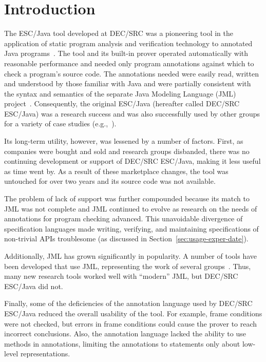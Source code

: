 \documentclass{llncs}
\begin{document}

\section{Introduction}

The ESC/Java tool developed at DEC/SRC was a pioneering tool in the
application of static program analysis and verification technology to
annotated Java programs~\cite{Flanagan-etal02}.  The tool and its
built-in prover operated automatically with reasonable performance and
needed only program annotations against which to check a program's
source code.  The annotations needed were easily read, written and
understood by those familiar with Java and were partially consistent
with the syntax and semantics of the separate Java Modeling Language
(JML) project~\cite{jmlpapers,Leavens-etal00}.  Consequently, the
original ESC/Java (hereafter called DEC/SRC ESC/Java) was a research
success and was also successfully used by other groups for a variety
of case studies (e.g.,~\cite{Hub03,HOP04}).

Its long-term utility, however, was lessened by a number of factors.
First, as companies were bought and sold and research groups
disbanded, there was no continuing development or support of DEC/SRC
ESC/Java, making it less useful as time went by.  As a result of these
marketplace changes, the tool was untouched for over two years and its
source code was not available.

The problem of lack of support was further compounded because its
match to JML was not complete and JML continued to evolve as research
on the needs of annotations for program checking advanced.  This
unavoidable divergence of specification languages made writing,
verifying, and maintaining specifications of non-trivial APIs
troublesome (as discussed in Section~\ref{sec:usage-exper-date}).

Additionally, JML has grown significantly in popularity.  A number of
tools have been developed that use JML, representing the work of
several
groups~\cite{Burdy-etal03,jmlpapers,Bogor03,NimmerErnst01,Leavens-etal00}.
Thus, many new research tools worked well with ``modern'' JML, but
DEC/SRC ESC/Java did not.

Finally, some of the deficiencies of the annotation language used by
DEC/SRC ESC/Java reduced the overall usability of the tool.  For
example, frame conditions were not checked, but errors in frame
conditions could cause the prover to reach incorrect conclusions.
Also, the annotation language lacked the ability to use methods in
annotations, limiting the annotations to statements only about
low-level representations.
\end{document}
